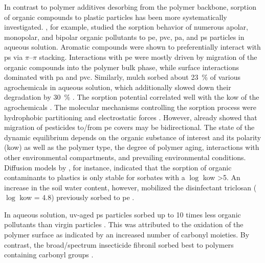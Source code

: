 In contrast to polymer additives desorbing from the polymer backbone, sorption of organic compounds to plastic particles has been more systematically investigated. , for example, studied the sorption behavior of numerous apolar, monopolar, and bipolar organic pollutants to \ac{pe}, \ac{pvc}, \ac{pa}, and \ac{ps} particles in aqueous solution. Aromatic compounds were shown to preferentially interact with \ac{ps} via $\pi$--$\pi$ stacking. Interactions with \ac{pe} were mostly driven by migration of the organic compounds into the polymer bulk phase, while surface interactions dominated with \ac{pa} and \ac{pvc}. Similarly,  mulch sorbed about \SI{23}{\percent} of various agrochemicals in aqueous solution, which additionally slowed down their degradation by \SI{30}{\percent} \citep{BeriotLaboratory2020}. The sorption potential correlated well with the \ac{kow} of the agrochemicals \citep{BeriotLaboratory2020,WangAdsorption2020,SuntaAdsorption2020,LanComparative2021}. The molecular mechanisms controlling the sorption process were hydrophobic partitioning and electrostatic forces \citep{TourinhoPartitioning2019,LanComparative2021}.
However, \citet{RamosPolyethylene2015} already showed that migration of pesticides to\slash from \ac{pe} covers may be bidirectional. The state of the dynamic equilibrium depends on the organic substance of interest and its polarity (\ac{kow}) as well as the polymer type, the degree of polymer aging, interactions with other environmental compartments, and prevailing environmental conditions. Diffusion models by \citet{CastanMicroplastics2021}, for instance, indicated that the sorption of organic contaminants to plastics is only stable for sorbates with a $\log$ \ac{kow} >5. An increase in the soil water content, however, mobilized the disinfectant triclosan ($\log$ \ac{kow} = 4.8) previously sorbed to \ac{pe} \citep{ChenComparison2021}.

In aqueous solution, \ac{uv}-aged \ac{ps} particles sorbed up to \num{10} times less organic pollutants than virgin particles \citep{HufferData2018,HufferSorption2018}. This was attributed to the oxidation of the polymer surface as indicated by an increased number of carbonyl moieties. By contrast, the broad\-/spectrum insecticide fibronil sorbed best to polymers containing carbonyl groups \citep{GongComparative2019}.

